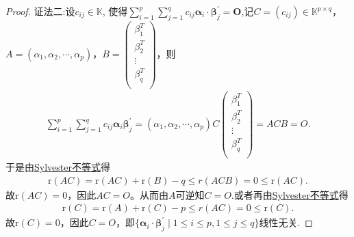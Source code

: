 \documentclass[../../main.tex]{subfiles}%
\begin{document}
\begin{proof}
{\color{blue}证法二:}设\(c_{ij}\in\mathbb{K}\), 使得\(\sum_{i = 1}^{p}\sum_{j = 1}^{q}c_{ij}\boldsymbol{\alpha}_{i}\cdot\boldsymbol{\beta}_{j}^{\prime}=\boldsymbol{O}\),记$C=( c_{ij} ) \in \mathbb{K} ^{p\times q}$，$A=( \alpha _1,\alpha _2,\cdots ,\alpha _p )$，$B=\begin{pmatrix}
\beta _{1}^{T}\\
\beta _{2}^{T}\\
\vdots\\
\beta _{q}^{T}\\
\end{pmatrix}$，则
\begin{align*}
\sum_{i=1}^p{\sum_{j=1}^q{c_{ij}\boldsymbol{\alpha }_i}}\boldsymbol{\beta }_{j}^{\prime}=(\alpha _1,\alpha _2,\cdots ,\alpha _p ) C\begin{pmatrix}
\beta _{1}^{T}\\
\beta _{2}^{T}\\
\vdots\\
\beta _{q}^{T}\\
\end{pmatrix}=ACB=O.
\end{align*}
于是由\hyperref[proposition:Sylvester(西尔维斯特)不等式]{Sylvester不等式}得
\begin{align*}
\mathrm{r}( AC ) =\mathrm{r}( AC ) +\mathrm{r}( B ) -q\leqslant r( ACB ) =0\leqslant \mathrm{r}( AC ).
\end{align*}
故$\mathrm{r}( AC )=0$，因此$AC=O$。从而由$A$可逆知$C=O$.或者再由\hyperref[proposition:Sylvester(西尔维斯特)不等式]{Sylvester不等式}得
\begin{align*}
\mathrm{r}( C ) =\mathrm{r}( A ) +\mathrm{r}( C ) -p\leqslant r( AC ) =0\leqslant \mathrm{r}( C ).
\end{align*}
故$\mathrm{r}( C )=0$，因此$C=O$，即$\{\boldsymbol{\alpha }_i\cdot \boldsymbol{\beta }_{j}^{\prime}\mid 1\leqslant i\leqslant p,1\leqslant j\leqslant q\}$线性无关.
\end{proof}
\end{document}
